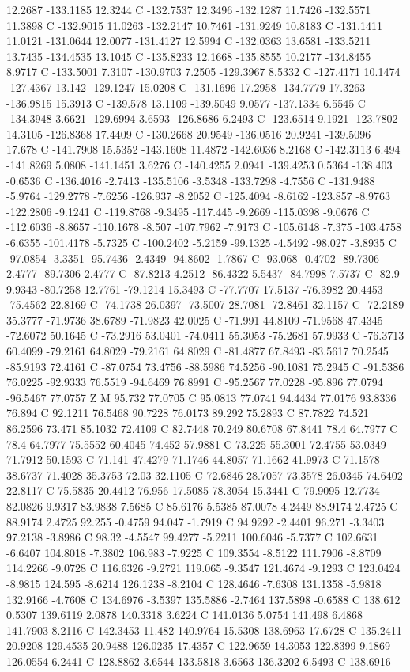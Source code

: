 {{{12.2687 -133.1185 12.3244 C -132.7537 12.3496 -132.1287 11.7426 -132.5571 11.3898 C -132.9015 11.0263 -132.2147 10.7461 -131.9249 10.8183 C -131.1411 11.0121 -131.0644 12.0077 -131.4127 12.5994 C -132.0363 13.6581 -133.5211 13.7435 -134.4535 13.1045 C -135.8233 12.1668 -135.8555 10.2177 -134.8455 8.9717 C -133.5001 7.3107 -130.9703 7.2505 -129.3967 8.5332 C -127.4171 10.1474 -127.4367 13.142 -129.1247 15.0208 C -131.1696 17.2958 -134.7779 17.3263 -136.9815 15.3913 C -139.578 13.1109 -139.5049 9.0577 -137.1334 6.5545 C -134.3948 3.6621 -129.6994 3.6593 -126.8686 6.2493 C -123.6514 9.1921 -123.7802 14.3105 -126.8368 17.4409 C -130.2668 20.9549 -136.0516 20.9241 -139.5096 17.678 C -141.7908 15.5352 -143.1608 11.4872 -142.6036 8.2168 C -142.3113 6.494 -141.8269 5.0808 -141.1451 3.6276 C -140.4255 2.0941 -139.4253 0.5364 -138.403 -0.6536 C -136.4016 -2.7413 -135.5106 -3.5348 -133.7298 -4.7556 C -131.9488 -5.9764 -129.2778 -7.6256 -126.937 -8.2052 C -125.4094 -8.6162 -123.857 -8.9763 -122.2806 -9.1241 C -119.8768 -9.3495 -117.445 -9.2669 -115.0398 -9.0676 C -112.6036 -8.8657 -110.1678 -8.507 -107.7962 -7.9173 C -105.6148 -7.375 -103.4758 -6.6355 -101.4178 -5.7325 C -100.2402 -5.2159 -99.1325 -4.5492 -98.027 -3.8935 C -97.0854 -3.3351 -95.7436 -2.4349 -94.8602 -1.7867 C -93.068 -0.4702 -89.7306 2.4777 -89.7306 2.4777 C -87.8213 4.2512 -86.4322 5.5437 -84.7998 7.5737 C -82.9 9.9343 -80.7258 12.7761 -79.1214 15.3493 C -77.7707 17.5137 -76.3982 20.4453 -75.4562 22.8169 C -74.1738 26.0397 -73.5007 28.7081 -72.8461 32.1157 C -72.2189 35.3777 -71.9736 38.6789 -71.9823 42.0025 C -71.991 44.8109 -71.9568 47.4345 -72.6072 50.1645 C -73.2916 53.0401 -74.0411 55.3053 -75.2681 57.9933 C -76.3713 60.4099 -79.2161 64.8029 -79.2161 64.8029 C -81.4877 67.8493 -83.5617 70.2545 -85.9193 72.4161 C -87.0754 73.4756 -88.5986 74.5256 -90.1081 75.2945 C -91.5386 76.0225 -92.9333 76.5519 -94.6469 76.8991 C -95.2567 77.0228 -95.896 77.0794 -96.5467 77.0757 Z M 95.732 77.0705 C 95.0813 77.0741 94.4434 77.0176 93.8336 76.894 C 92.1211 76.5468 90.7228 76.0173 89.292 75.2893 C 87.7822 74.521 86.2596 73.471 85.1032 72.4109 C 82.7448 70.249 80.6708 67.8441 78.4 64.7977 C 78.4 64.7977 75.5552 60.4045 74.452 57.9881 C 73.225 55.3001 72.4755 53.0349 71.7912 50.1593 C 71.141 47.4279 71.1746 44.8057 71.1662 41.9973 C 71.1578 38.6737 71.4028 35.3753 72.03 32.1105 C 72.6846 28.7057 73.3578 26.0345 74.6402 22.8117 C 75.5835 20.4412 76.956 17.5085 78.3054 15.3441 C 79.9095 12.7734 82.0826 9.9317 83.9838 7.5685 C 85.6176 5.5385 87.0078 4.2449 88.9174 2.4725 C 88.9174 2.4725 92.255 -0.4759 94.047 -1.7919 C 94.9292 -2.4401 96.271 -3.3403 97.2138 -3.8986 C 98.32 -4.5547 99.4277 -5.2211 100.6046 -5.7377 C 102.6631 -6.6407 104.8018 -7.3802 106.983 -7.9225 C 109.3554 -8.5122 111.7906 -8.8709 114.2266 -9.0728 C 116.6326 -9.2721 119.065 -9.3547 121.4674 -9.1293 C 123.0424 -8.9815 124.595 -8.6214 126.1238 -8.2104 C 128.4646 -7.6308 131.1358 -5.9818 132.9166 -4.7608 C 134.6976 -3.5397 135.5886 -2.7464 137.5898 -0.6588 C 138.612 0.5307 139.6119 2.0878 140.3318 3.6224 C 141.0136 5.0754 141.498 6.4868 141.7903 8.2116 C 142.3453 11.482 140.9764 15.5308 138.6963 17.6728 C 135.2411 20.9208 129.4535 20.9488 126.0235 17.4357 C 122.9659 14.3053 122.8399 9.1869 126.0554 6.2441 C 128.8862 3.6544 133.5818 3.6563 136.3202 6.5493 C 138.6916 }}}
